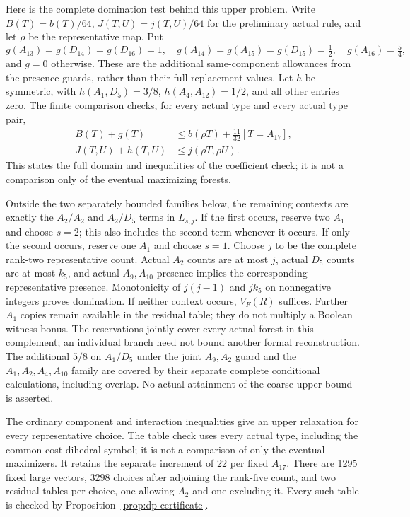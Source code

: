 \documentclass[11pt]{article}
\theoremstyle{remark}\newtheorem{remark}[theorem]{Remark}
\begin{document}
Here is the complete domination test behind this upper problem. Write
$B(T)=b(T)/64$, $J(T,U)=j(T,U)/64$ for the preliminary actual rule, and
let $\rho$ be the representative map. Put
\[
 g(A_{13})=g(D_{14})=g(D_{16})=1,\quad
 g(A_{14})=g(A_{15})=g(D_{15})=\tfrac12,\quad g(A_{16})=\tfrac54,
\]
and $g=0$ otherwise. These are the additional same-component allowances
from the presence guards, rather than their full replacement values.
Let $h$ be symmetric, with $h(A_1,D_5)=3/8$,
$h(A_4,A_{12})=1/2$, and all other entries zero. The finite comparison
checks, for every actual type and every actual type pair,
\begin{align*}
 B(T)+g(T)&\le\bar b(\rho T)+\tfrac{11}{32}[T=A_{17}],\\
 J(T,U)+h(T,U)&\le\bar j(\rho T,\rho U).
\end{align*}
This states the full domain and inequalities of the coefficient check;
it is not a comparison only of the eventual maximizing forests.

Outside the two separately bounded families below, the remaining
contexts are exactly the $A_2/A_2$ and $A_2/D_5$ terms in $L_{s,j}$.
If the first occurs, reserve two $A_1$ and choose $s=2$; this also
includes the second term whenever it occurs. If only the second occurs,
reserve one $A_1$ and choose $s=1$. Choose $j$ to be the complete rank-two
representative count. Actual $A_2$ counts are at most $j$, actual $D_5$
counts are at most $k_5$, and actual $A_9,A_{10}$ presence implies the
corresponding representative presence. Monotonicity of $j(j-1)$ and
$jk_5$ on nonnegative integers proves domination. If neither context
occurs, $V_F(R)$ suffices. Further $A_1$ copies remain available in the
residual table; they do not multiply a Boolean witness bonus.
The reservations jointly cover every actual forest in this complement;
an individual branch need not bound another formal reconstruction.
The additional $5/8$ on $A_1/D_5$ under the joint $A_9,A_2$ guard and
the $A_1,A_2,A_4,A_{10}$ family are covered by their separate complete
conditional calculations, including overlap. No actual attainment of
the coarse upper bound is asserted.

The ordinary component and interaction inequalities give an upper
relaxation for every representative choice. The table check uses
every actual type, including the common-cost dihedral symbol;
it is not a comparison of only the eventual maximizers. It
retains the separate increment of 22 per fixed $A_{17}$. There
are 1295 fixed large vectors, 3298 choices after adjoining the
rank-five count, and two residual tables per choice, one allowing
$A_2$ and one excluding it. Every such table is checked by
Proposition~\ref{prop:dp-certificate}.
\end{document}
